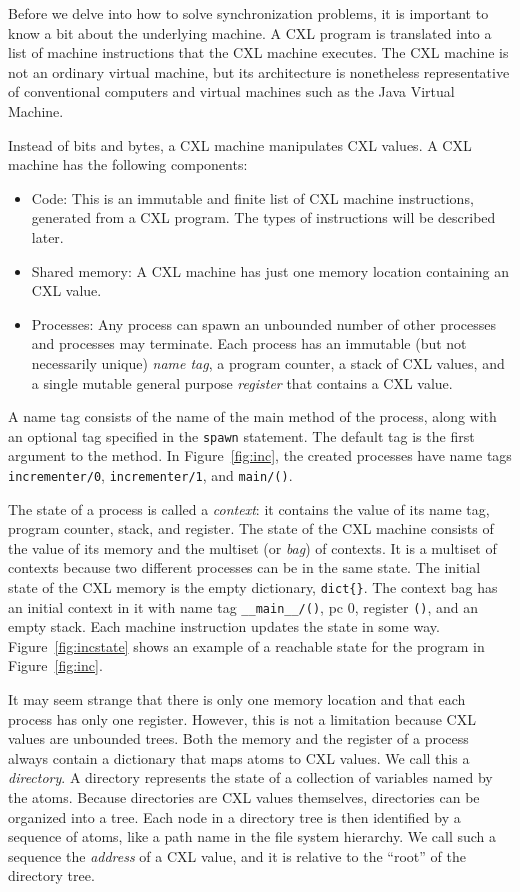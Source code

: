 \documentclass{report}
\begin{document}
Before we delve into how to solve synchronization problems, it is important
to know a bit about the underlying machine.  A CXL program is translated
into a list of machine instructions that the CXL machine executes.
The CXL machine is not an ordinary virtual machine, but its architecture
is nonetheless representative of conventional computers and
virtual machines such as the Java Virtual Machine.

Instead of bits and bytes, a CXL machine manipulates CXL values.
A CXL machine has the following components:
\begin{itemize}
\item Code:  This is an immutable and finite list of CXL machine instructions,
generated from a CXL program.  The types of instructions will be described later.
\item Shared memory: A CXL machine has just one memory location containing
an CXL value.
\item Processes:  Any process
can spawn an unbounded number of other processes and processes may terminate.
Each process has an immutable (but not necessarily unique) \emph{name tag},
a program counter, a stack of CXL values,
and a single mutable general purpose \emph{register} that contains a CXL value.
\end{itemize}

A name tag consists of the name of the main method of the process,
along with an optional tag specified in the \texttt{spawn} statement.
The default tag is the first argument to the method.
In Figure~\ref{fig:inc}, the created processes have name tags
\texttt{incrementer/0}, \texttt{incrementer/1}, and \texttt{main/()}.

The state of a process is called a \emph{context}: it contains the value of
its name tag, program counter, stack, and register.
The state of the CXL machine
consists of the value of its memory and the multiset (or \emph{bag}) of
contexts.  It is a multiset of contexts because two different processes can
be in the same state.
The initial state of the CXL memory is the empty dictionary, \texttt{dict\{\}}.
The context bag has an initial context in it with name tag
\texttt{\_\_main\_\_/()}, pc 0, register \texttt{()}, and an empty stack.
Each machine instruction updates the state in some way.
Figure~\ref{fig:incstate} shows an example of a reachable state for 
the program in Figure~\ref{fig:inc}.


It may seem strange that there is only one memory location and that each
process has only one register.  However, this is not a limitation because
CXL values are unbounded trees.
Both the memory and the register of a process always contain
a dictionary that maps atoms to CXL values.  We call this a \emph{directory}.
A directory represents the state of a collection of variables named by the atoms.
%
Because directories are CXL values themselves,
directories can be organized into a tree.
Each node in a directory tree is then identified
by a sequence of atoms, like a path name in the file system hierarchy.  We call
such a sequence the \emph{address} of a CXL value, and it is relative to the
``root'' of the directory tree.
\end{document}
